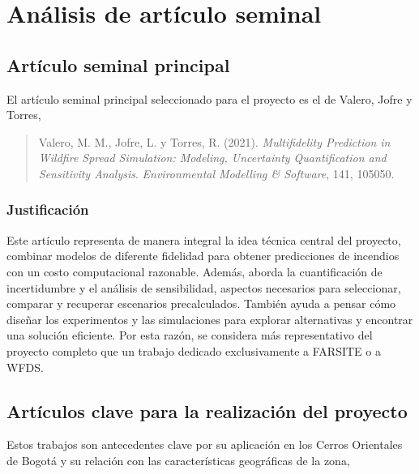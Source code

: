 \clearpage
\section{Análisis de artículo seminal}

\subsection{Artículo seminal principal}

El artículo seminal principal seleccionado para el proyecto es el de Valero, Jofre y Torres,

\begin{quote}
Valero, M. M., Jofre, L. y Torres, R. (2021). \textit{Multifidelity Prediction in Wildfire Spread Simulation: Modeling, Uncertainty Quantification and Sensitivity Analysis}. \textit{Environmental Modelling \& Software}, 141, 105050.
\end{quote}

\subsubsection{Justificación}

Este artículo representa de manera integral la idea técnica central del proyecto, combinar modelos de diferente fidelidad para obtener predicciones de incendios con un costo computacional razonable. Además, aborda la cuantificación de incertidumbre y el análisis de sensibilidad, aspectos necesarios para seleccionar, comparar y recuperar escenarios precalculados. También ayuda a pensar cómo diseñar los experimentos y las simulaciones para explorar alternativas y encontrar una solución eficiente. Por esta razón, se considera más representativo del proyecto completo que un trabajo dedicado exclusivamente a FARSITE o a WFDS.

\subsection{Artículos clave para la realización del proyecto}

Estos trabajos son antecedentes clave por su aplicación en los Cerros Orientales de Bogotá y su relación con las características geográficas de la zona,

